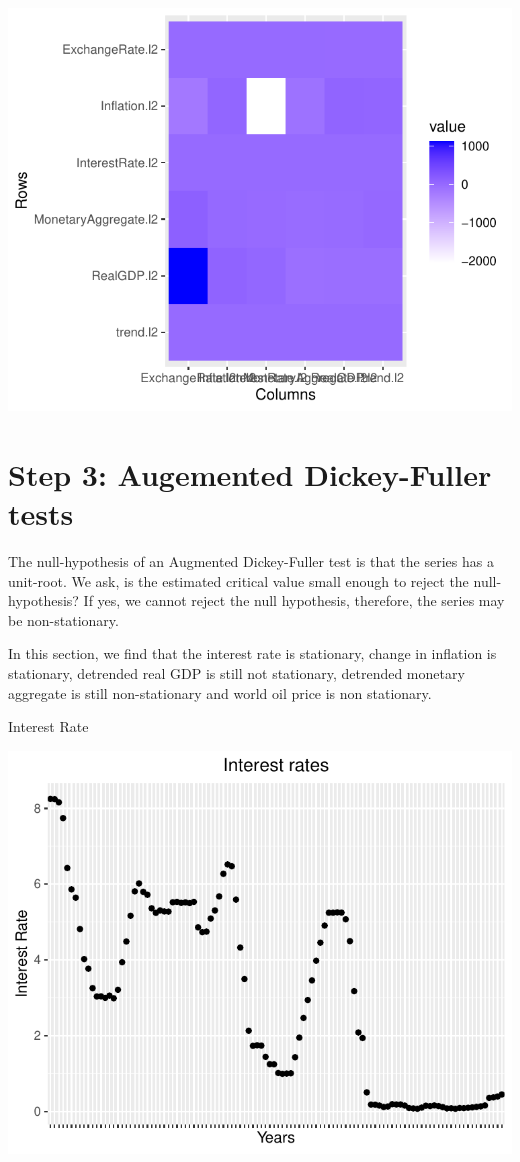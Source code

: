 \documentclass[11pt,preprint, authoryear]{elsarticle}
\numberwithin{equation}{section}
\numberwithin{figure}{section}
\numberwithin{table}{section}
\begin{document}
\begin{center}\includegraphics{README_files/figure-latex/unnamed-chunk-10-1} \end{center}

\hypertarget{step-3-augemented-dickey-fuller-tests}{%
\section{Step 3: Augemented Dickey-Fuller
tests}\label{step-3-augemented-dickey-fuller-tests}}

The null-hypothesis of an Augmented Dickey-Fuller test is that the
series has a unit-root. We ask, is the estimated critical value small
enough to reject the null-hypothesis? If yes, we cannot reject the null
hypothesis, therefore, the series may be non-stationary.

In this section, we find that the interest rate is stationary, change in
inflation is stationary, detrended real GDP is still not stationary,
detrended monetary aggregate is still non-stationary and world oil price
is non stationary.

Interest Rate

\begin{center}\includegraphics{README_files/figure-latex/unnamed-chunk-12-1} \end{center}
\end{document}
